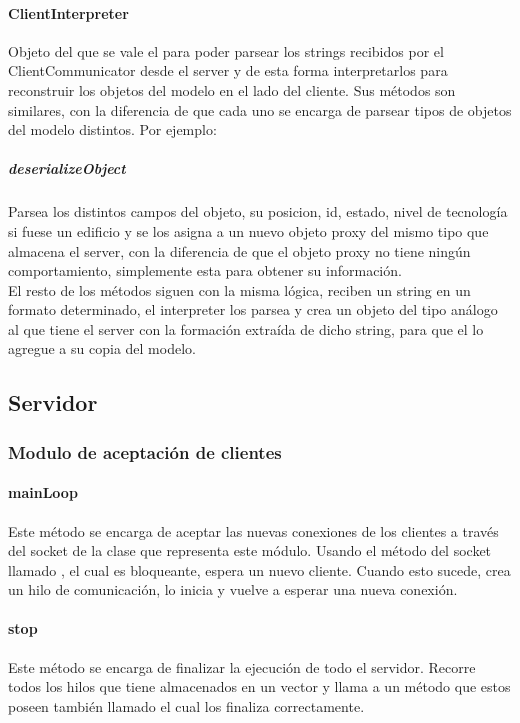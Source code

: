         \paragraph{ClientInterpreter}
            Objeto del que se vale el  para poder parsear
            los strings recibidos por el ClientCommunicator desde el server y de
            esta forma interpretarlos para reconstruir los objetos del modelo en
            el lado del cliente. Sus métodos son similares, con la diferencia de
            que cada uno se encarga de parsear tipos de objetos del modelo
            distintos. Por ejemplo:
            \subparagraph{deserializeObject}
                Parsea los distintos campos del objeto, su posicion, id, estado,
                nivel de tecnología si fuese un edificio y se los asigna a un
                nuevo objeto proxy del mismo tipo que almacena el server, con la
                diferencia de que el objeto proxy no tiene ningún comportamiento,
                simplemente esta para obtener su información.\\
                El resto de los métodos siguen con la misma lógica, reciben un
                string en un formato determinado, el interpreter los parsea y
                crea un objeto del tipo análogo al que tiene el server con la
                formación extraída de dicho string, para que el 
                lo agregue a su copia del modelo.
\subsection{Servidor}
    \subsubsection{Modulo de aceptación de clientes}
        \paragraph{mainLoop}
            Este método se encarga de aceptar las nuevas conexiones de los
            clientes a través del socket de la clase que representa este módulo.
            Usando el método del socket llamado , el cual es
            bloqueante, espera un nuevo cliente. Cuando esto sucede, crea un
            hilo de comunicación, lo inicia y vuelve a esperar una
            nueva conexión.
        \paragraph{stop}
            Este método se encarga de finalizar la ejecución de todo el servidor.
            Recorre todos los hilos  que tiene
            almacenados en un vector y llama a un método que estos poseen
            también llamado  el cual los finaliza correctamente.
